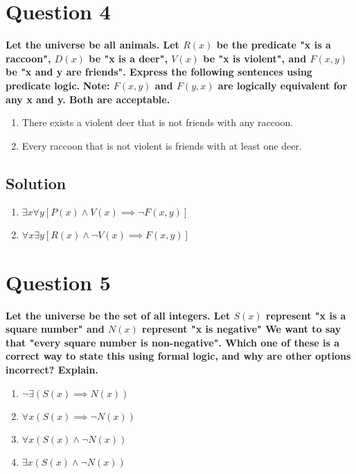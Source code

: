 \documentclass[11pt]{article}
\begin{document}
\clearpage
\section*{Question 4}
    \textbf{Let the universe be all animals. Let \(R(x)\) be the predicate "x is a raccoon", \(D(x)\) be "x is a deer", \(V(x)\) be "x is violent", and \(F(x, y)\) be "x and y are friends". Express the following sentences using predicate logic.}\newline
    \textbf{Note: \(F(x, y)\) and \(F(y, x)\) are logically equivalent for any x and y. Both are acceptable.}
    \begin{enumerate}[label=(\alph*)]
        \item There exists a violent deer that is not friends with any raccoon.
        \item Every raccoon that is not violent is friends with at least one deer.
    \end{enumerate}
    \subsection*{Solution}
    \begin{enumerate}[label=(\alph*)]
        \item \(\exists x \forall y [P(x) \land V(x) \implies \neg F(x,y)]\)
        \item \(\forall x \exists y [R(x) \land \neg V(x) \implies F(x,y)]\)
    \end{enumerate}

\clearpage
\section*{Question 5}
    \textbf{Let the universe be the set of all integers. Let \(S(x)\) represent "x is a square number" and \(N(x)\) represent "x is negative" We want to say that "every square number is non-negative". Which one of these is a correct way to state this using formal logic, and why are other options incorrect? Explain.}
    \begin{enumerate}[label=(\alph*)]
        \item \(\neg \exists (S(x) \implies N(x))\)
        \item \(\forall x(S(x) \implies \neg N(x))\)
        \item \(\forall x(S(x) \land \neg N(x))\)
        \item \(\exists x (S(x) \land \neg N(x))\)
    \end{enumerate}
\end{document}
